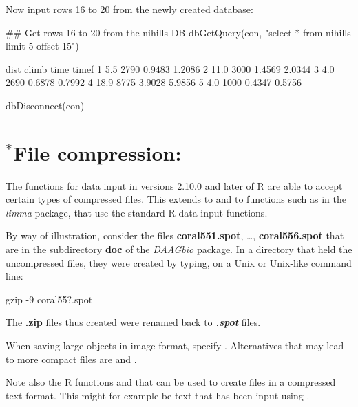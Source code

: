 Now input rows 16 to 20 from the newly created database:
\begin{Schunk}
\begin{Sinput}
## Get rows 16 to 20 from the nihills DB
dbGetQuery(con,
  "select * from nihills limit 5 offset 15")
\end{Sinput}
\begin{Soutput}
  dist climb   time  timef
1  5.5  2790 0.9483 1.2086
2 11.0  3000 1.4569 2.0344
3  4.0  2690 0.6878 0.7992
4 18.9  8775 3.9028 5.9856
5  4.0  1000 0.4347 0.5756
\end{Soutput}
\begin{Sinput}
dbDisconnect(con)
\end{Sinput}
\end{Schunk}

\section{$^*$File compression:} The functions for data
input in versions 2.10.0 and later of R are able to accept certain
types of compressed files.  This extends to  and to
functions such as  in the {\em limma}
package, that use the standard R data input functions.

By way of illustration, consider the files \textbf{coral551.spot},
\ldots, \textbf{coral556.spot} that are in the subdirectory
\textbf{doc} of the \textit{DAAGbio} package. In a directory that held
the uncompressed files, they were created by typing, on a Unix or
Unix-like command line: 
\begin{Schunk}
\begin{Sinput}
gzip -9 coral55?.spot
\end{Sinput}
\end{Schunk}
\noindent
The {\bf .zip} files thus created were renamed back to
\textbf{\em *.spot} files.

When saving large objects in image format, specify .
Alternatives that may lead to more compact files are 
and .

Note also the R functions  and  that can
be used to create files in a compressed text format.  This might for
example be text that has been input using .

